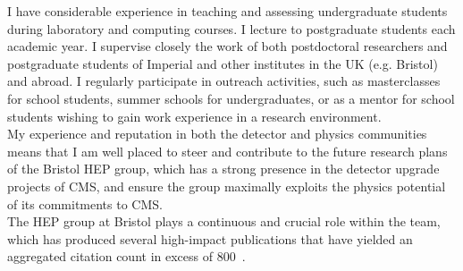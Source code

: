 I have considerable experience in teaching and assessing undergraduate
students during laboratory and computing courses. I lecture to
postgraduate students each academic year. I supervise closely the work
of both postdoctoral researchers and postgraduate students of Imperial
and other institutes in the UK (e.g. Bristol) and abroad. I regularly
participate in outreach activities, such as masterclasses for school
students, summer schools for undergraduates, or as a mentor for school
students wishing to gain work experience in a research environment. \\

My experience and reputation in both the detector and physics
communities means that I am well placed to steer and contribute to the
future research plans of the Bristol HEP group, which has a strong
presence in the detector upgrade projects of CMS, and ensure the group
maximally exploits the physics potential of its commitments to CMS. \\


The HEP group at Bristol plays a continuous and crucial role within
the team, which has produced several high-impact publications that
have yielded an aggregated citation count in excess of
800~\cite{pub-alphat6, pub-alphat5, pub-alphat4, pub-alphat3,
  pub-alphat2, pub-alphat1}. \\





